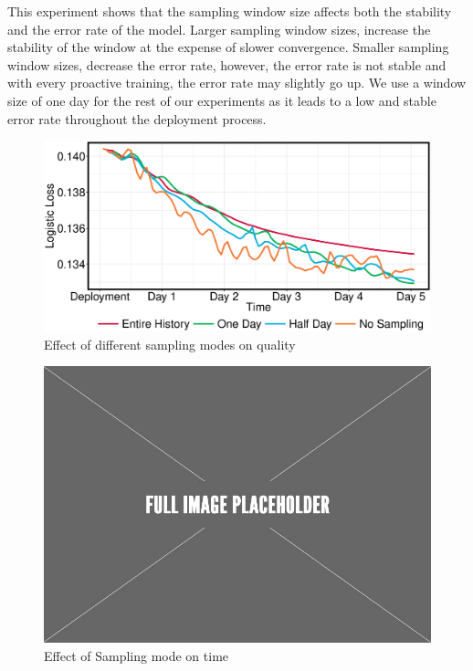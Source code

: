 This experiment shows that the sampling window size affects both the stability and the error rate of the model.
Larger sampling window sizes, increase the stability of the window at the expense of slower convergence. 
Smaller sampling window sizes, decrease the error rate, however, the error rate is not stable and with every proactive training, the error rate may slightly go up.
We use a window size of one day for the rest of our experiments as it leads to a low and stable error rate throughout the deployment process.


\begin{figure}[h!]
\centering
\includegraphics[width=\columnwidth]{../images/experiment-results/criteo-sampling-mode-experiments.eps}
\caption{Effect of different sampling modes on quality}
\label{fig:sampling-mode-quality}
\vspace{2mm}
\end{figure}

\begin{figure}[h!]
\centering
\includegraphics[width=\columnwidth]{../images/placeholder.jpeg}
\caption{Effect of Sampling mode on time}
\label{fig:sampling-mode-time}
\vspace{2mm}
\end{figure}



